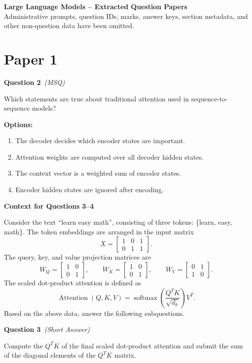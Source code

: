 \documentclass[11pt]{article}
\newcommand{\q}[2]{\vspace{0.5em}\noindent\textbf{Question #1}\if\relax\detokenize{#2}\relax\else\ \textit{(#2)}\fi\par}
\newcommand{\opts}{\textbf{Options:}}
\newcommand{\contexthead}[1]{\vspace{0.6em}\noindent\textbf{Context for Questions #1}\par}
\begin{document}
\begin{center}
{\Large\bfseries Large Language Models -- Extracted Question Papers}\\[2mm]
{\small Administrative prompts, question IDs, marks, answer keys, section metadata, and other non-question data have been omitted.}
\end{center}

\section*{Paper 1}

\q{2}{MSQ}
Which statements are true about traditional attention used in sequence-to-sequence models?

\opts
\begin{enumerate}[label=(\alph*)]
\item The decoder decides which encoder states are important.
\item Attention weights are computed over all decoder hidden states.
\item The context vector is a weighted sum of encoder states.
\item Encoder hidden states are ignored after encoding.
\end{enumerate}

\contexthead{3--4}
Consider the text ``learn easy math'', consisting of three tokens: \{learn, easy, math\}.
The token embeddings are arranged in the input matrix
\[
X=\begin{bmatrix}1&0&1\\0&1&1\end{bmatrix}.
\]
The query, key, and value projection matrices are
\[
W_Q=\begin{bmatrix}1&0\\0&1\end{bmatrix},\qquad
W_K=\begin{bmatrix}1&0\\0&1\end{bmatrix},\qquad
W_V=\begin{bmatrix}0&1\\1&0\end{bmatrix}.
\]
The scaled dot-product attention is defined as
\[
\operatorname{Attention}(Q,K,V)
=\operatorname{softmax}\!\left(\frac{Q^{T}K}{\sqrt{d_k}}\right)V^{T}.
\]
Based on the above data, answer the following subquestions.

\q{3}{Short Answer}
Compute the $Q^{T}K$ of the final scaled dot-product attention and submit the sum of the diagonal elements of the $Q^{T}K$ matrix.
\end{document}
